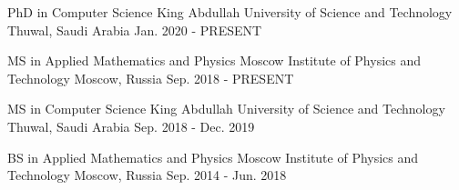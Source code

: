 


\begin{cventries}


\cventry
{PhD in Computer Science } %
{King Abdullah University of Science and Technology} %
{Thuwal, Saudi Arabia} %
{Jan. 2020 - PRESENT} %
{
}

\cventry
{MS in Applied Mathematics and Physics} %
{Moscow Institute of Physics and Technology} %
{Moscow, Russia} %
{Sep. 2018 - PRESENT} %
{ %
}

\cventry
{MS in Computer Science } %
{King Abdullah University of Science and Technology} %
{Thuwal, Saudi Arabia} %
{Sep. 2018 - Dec. 2019} %
{
}

\cventry
{BS in Applied Mathematics and Physics} %
{Moscow Institute of Physics and Technology} %
{Moscow, Russia} %
{Sep. 2014 - Jun. 2018} %
{ %
}


\end{cventries}